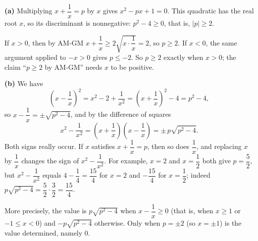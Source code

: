 \textbf{(a)} Multiplying $x+\dfrac{1}{x}=p$ by $x$ gives $x^2-px+1=0$. This quadratic has the real root $x$, so its discriminant is nonnegative: $p^2-4\ge0$, that is, $|p|\ge2$.

If $x>0$, then by AM-GM $x+\dfrac{1}{x}\ge2\sqrt{x\cdot\dfrac{1}{x}}=2$, so $p\ge2$. If $x<0$, the same argument applied to $-x>0$ gives $p\le-2$. So $p\ge2$ exactly when $x>0$; the claim ``$p\ge2$ by AM-GM'' needs $x$ to be positive.

\textbf{(b)} We have
\[\left(x-\dfrac{1}{x}\right)^2=x^2-2+\dfrac{1}{x^2}=\left(x+\dfrac{1}{x}\right)^2-4=p^2-4,\]
so $x-\dfrac{1}{x}=\pm\sqrt{p^2-4}$, and by the difference of squares
\[x^2-\dfrac{1}{x^2}=\left(x+\dfrac{1}{x}\right)\left(x-\dfrac{1}{x}\right)=\boxed{\pm\,p\sqrt{p^2-4}}.\]
Both signs really occur. If $x$ satisfies $x+\dfrac{1}{x}=p$, then so does $\dfrac{1}{x}$, and replacing $x$ by $\dfrac{1}{x}$ changes the sign of $x^2-\dfrac{1}{x^2}$. For example, $x=2$ and $x=\dfrac{1}{2}$ both give $p=\dfrac{5}{2}$, but $x^2-\dfrac{1}{x^2}$ equals $4-\dfrac{1}{4}=\dfrac{15}{4}$ for $x=2$ and $-\dfrac{15}{4}$ for $x=\dfrac{1}{2}$; indeed $p\sqrt{p^2-4}=\dfrac{5}{2}\cdot\dfrac{3}{2}=\dfrac{15}{4}$.

More precisely, the value is $p\sqrt{p^2-4}$ when $x-\dfrac{1}{x}\ge0$ (that is, when $x\ge1$ or $-1\le x<0$) and $-p\sqrt{p^2-4}$ otherwise. Only when $p=\pm2$ (so $x=\pm1$) is the value determined, namely $0$.

